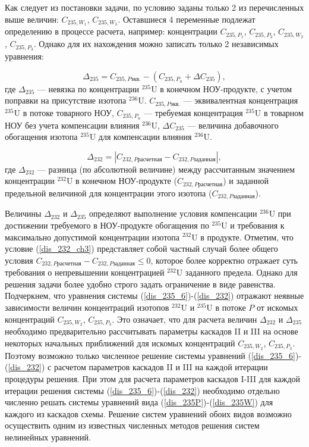 Как следует из постановки задачи, по условию заданы только 2 из перечисленных выше величин: $C_{235,{W_1}}$, $C_{235,{W_3}}$. Оставшиеся 4 переменные подлежат определению в процессе расчета, например: концентрации $C_{235,{P_1}}$, $C_{235,{P_2}}$, $C_{235,{W_2}}$, $C_{235,{P_3}}$. Однако для их нахождения можно записать только 2 независимых уравнения:  

\begin{equation}
    \label{dis_235_6}
    \Delta_{235}=C_{235,P\textit{экв.}}-(C_{235,{P_{n}}}+\Delta C_{235}),
\end{equation}
где $\Delta_{235}$ --- невязка по концентрации $^{235}$U в конечном НОУ-продукте, с учетом поправки на присутствие изотопа $^{236}$U. $C_{235,P\textit{экв.}}$ --- эквивалентная концентрация $^{235}$U в потоке товарного НОУ, $C_{235,{P_{n}}}$ --- требуемая концентрация $^{235}$U в товарном НОУ без учета компенсации влияния $^{236}$U, $\Delta C_{235}$ --- величина добавочного обогащения изотопа $^{235}$U для компенсации влияния $^{236}$U. 

\begin{equation}
\label{dis_232}
\Delta_{232}=\left|C_{232,P\textit{расчетная}}-C_{232,P\textit{заданная}}\right|,
\end{equation}
где $\Delta_{232}$ --- разница (по абсолютной величине) между рассчитанным значением концентрации $^{232}$U в конечном НОУ-продукте ($C_{232,P\textit{расчетная}}$) и заданной предельной величиной для концентрации этого изотопа ($C_{232,P\textit{заданная}}$).

Величины $\Delta_{232}$ и $\Delta_{235}$ определяют выполнение условия компенсации $^{236}$U при достижении требуемого в НОУ-продукте обогащения по $^{235}$U и требования к максимально допустимой концентрации изотопа $^{232}$U в продукте. Отметим, что условие (\ref{dis_232_ch3}) представляет собой частный случай более общего условия $C_{232,P\textit{расчетная}}-C_{232,P\textit{заданная}}\leq 0$, которое более корректно отражает суть требования о непревышении концентрацией $^{232}$U заданного предела. Однако для решения задачи более удобно строго задать ограничение в виде равенства. Подчеркнем, что уравнения системы (\ref{dis_235_6})-(\ref{dis_232}) отражают неявные зависимости величин концентраций изотопов $^{232}$U и $^{235}$U в потоке $P$ от искомых концентраций $C_{235,{W_2}}$, $C_{235,{P_3}}$. Это означает, что для расчета величин $\Delta_{232}$ и $\Delta_{235}$ необходимо предварительно рассчитывать параметры каскадов II и III на основе некоторых начальных приближений для искомых концентраций $C_{235,{W_2}}$, $C_{235,{P_3}}$. Поэтому возможно только численное решение системы уравнений (\ref{dis_235_6})-(\ref{dis_232}) с расчетом параметров каскадов II и III на каждой итерации процедуры решения. При этом для расчета параметров каскадов I-III для каждой итерации решения системы (\ref{dis_235_6})-(\ref{dis_232}) необходимо отдельно численно решать системы уравнений вида (\ref{dis_235P})-(\ref{dis_235W}) для каждого из каскадов схемы. Решение систем уравнений обоих видов возможно осуществить одним из известных численных методов решения систем нелинейных уравнений. 

